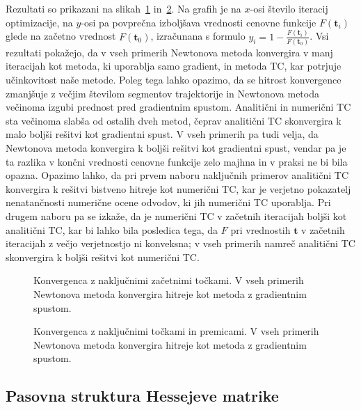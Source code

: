 \documentclass[isrm2, tisk]{fmfdelo}
\newcommand{\tvec}{\mathbf{t}}
\begin{document}
 Rezultati so prikazani na slikah~\ref{fig:convergence_random} in~\ref{fig:convergence_random_and_line}. Na grafih je na $x$-osi število iteracij optimizacije, na $y$-osi pa povprečna izboljšava vrednosti cenovne funkcije $F(\tvec_i)$ glede na začetno vrednost $F(\tvec_0)$, izračunana s formulo $y_i = 1 - \frac{F(\tvec_i)}{F(\tvec_0)}$. Vsi rezultati pokažejo, da v vseh primerih Newtonova metoda konvergira v manj iteracijah kot metoda, ki uporablja samo gradient, in metoda TC, kar potrjuje učinkovitost naše metode. Poleg tega lahko opazimo, da se hitrost konvergence zmanjšuje z večjim številom segmentov trajektorije in Newtonova metoda večinoma  izgubi prednost pred gradientnim spustom. Analitični in numerični TC sta večinoma slabša od ostalih dveh metod, čeprav analitični TC skonvergira k malo boljši rešitvi kot gradientni spust. V vseh primerih pa tudi velja, da Newtonova metoda konvergira k boljši rešitvi kot gradientni spust, vendar pa je ta razlika v končni vrednosti cenovne funkcije zelo majhna in v praksi ne bi bila opazna. Opazimo lahko, da pri prvem naboru naključnih primerov analitični TC konvergira k rešitvi bistveno hitreje kot numerični TC, kar je verjetno pokazatelj nenatančnosti numerične ocene odvodov, ki jih numerični TC uporablja. Pri drugem naboru pa se izkaže, da je numerični TC v začetnih iteracijah boljši kot analitični TC, kar bi lahko bila posledica tega, da $F$ pri vrednostih $\tvec$ v začetnih iteracijah z večjo verjetnostjo ni konveksna; v vseh primerih namreč analitični TC skonvergira k boljši rešitvi kot numerični TC.



\begin{figure}
    \centering
    
    \caption{Konvergenca z naključnimi začetnimi točkami. V vseh primerih Newtonova metoda konvergira hitreje kot metoda z gradientnim spustom.}
    \label{fig:convergence_random}
\end{figure}

\begin{figure}
    \centering
    
    \caption{Konvergenca z naključnimi točkami in premicami. V vseh primerih Newtonova metoda konvergira hitreje kot metoda z gradientnim spustom.}
    \label{fig:convergence_random_and_line}
\end{figure}

\subsection{Pasovna struktura Hessejeve matrike}
\label{sec:bands_analysis}
\end{document}
